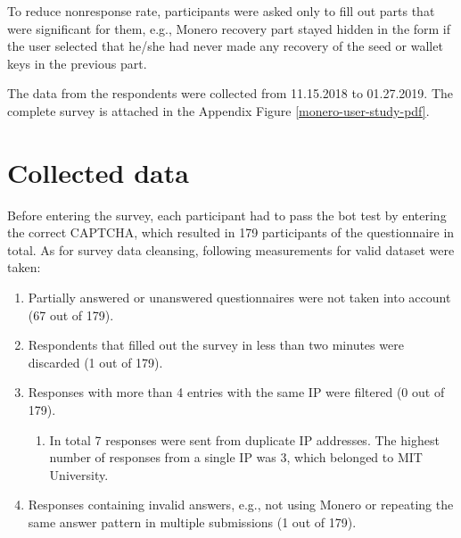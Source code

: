 \documentclass[
  printed, %
  table,   %
  lof,     %
  lot,     %
           oneside, color
]{fithesis3}
\begin{document}
To reduce nonresponse rate, participants were asked only to fill out parts that were significant for them, e.g., Monero recovery part stayed hidden in the form if the user selected that he/she had never made any recovery of the seed or wallet keys in the previous part. 

The data from the respondents were collected from 11.15.2018 to 01.27.2019. The complete survey is attached in the Appendix Figure \ref{monero-user-study-pdf}.

\section{Collected data}
Before entering the survey, each participant had to pass the bot test by entering the correct CAPTCHA, which resulted in 179 participants of the questionnaire in total. As for survey data cleansing, following measurements for valid dataset were taken:
\begin{enumerate}
\itemsep0em
\item Partially answered or unanswered questionnaires were not taken into account (67 out of 179). 
\item Respondents that filled out the survey in less than two minutes were discarded (1 out of 179).
\item Responses with more than 4 entries with the same IP were filtered (0 out of 179).
\begin{enumerate}
\itemsep0em
\item In total 7 responses were sent from duplicate IP addresses. The highest number of responses from a single IP was 3, which belonged to MIT University.
\end{enumerate}
\item Responses containing invalid answers, e.g., not using Monero or repeating the same answer pattern in multiple submissions (1 out of 179).
\end{enumerate}\vspace{-2.3em}
\end{document}
